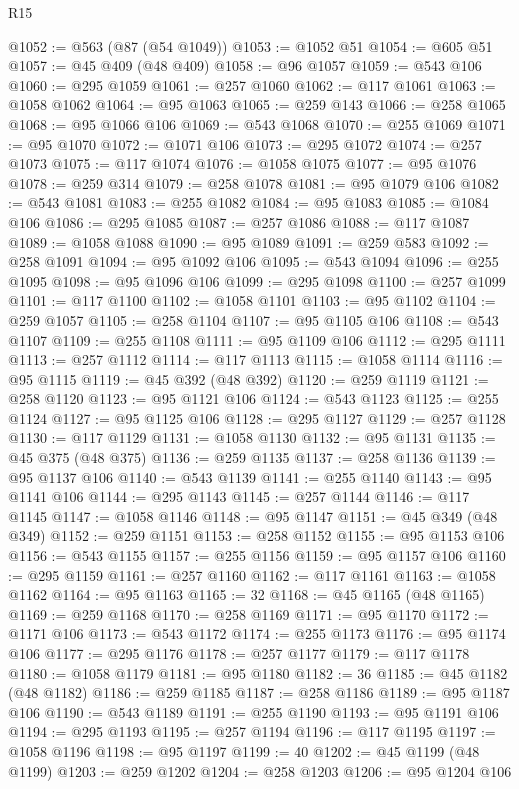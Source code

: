 \begin{lexlean}{R15}
\begin{coremodule}
@1052 := @563 (@87 (@54 @1049))
@1053 := @1052 @51
@1054 := @605 @51
@1057 := @45 @409 (@48 @409)
@1058 := @96 @1057
@1059 := @543 @106
@1060 := @295 @1059
@1061 := @257 @1060
@1062 := @117 @1061
@1063 := @1058 @1062
@1064 := @95 @1063
@1065 := @259 @143
@1066 := @258 @1065
@1068 := @95 @1066 @106
@1069 := @543 @1068
@1070 := @255 @1069
@1071 := @95 @1070
@1072 := @1071 @106
@1073 := @295 @1072
@1074 := @257 @1073
@1075 := @117 @1074
@1076 := @1058 @1075
@1077 := @95 @1076
@1078 := @259 @314
@1079 := @258 @1078
@1081 := @95 @1079 @106
@1082 := @543 @1081
@1083 := @255 @1082
@1084 := @95 @1083
@1085 := @1084 @106
@1086 := @295 @1085
@1087 := @257 @1086
@1088 := @117 @1087
@1089 := @1058 @1088
@1090 := @95 @1089
@1091 := @259 @583
@1092 := @258 @1091
@1094 := @95 @1092 @106
@1095 := @543 @1094
@1096 := @255 @1095
@1098 := @95 @1096 @106
@1099 := @295 @1098
@1100 := @257 @1099
@1101 := @117 @1100
@1102 := @1058 @1101
@1103 := @95 @1102
@1104 := @259 @1057
@1105 := @258 @1104
@1107 := @95 @1105 @106
@1108 := @543 @1107
@1109 := @255 @1108
@1111 := @95 @1109 @106
@1112 := @295 @1111
@1113 := @257 @1112
@1114 := @117 @1113
@1115 := @1058 @1114
@1116 := @95 @1115
@1119 := @45 @392 (@48 @392)
@1120 := @259 @1119
@1121 := @258 @1120
@1123 := @95 @1121 @106
@1124 := @543 @1123
@1125 := @255 @1124
@1127 := @95 @1125 @106
@1128 := @295 @1127
@1129 := @257 @1128
@1130 := @117 @1129
@1131 := @1058 @1130
@1132 := @95 @1131
@1135 := @45 @375 (@48 @375)
@1136 := @259 @1135
@1137 := @258 @1136
@1139 := @95 @1137 @106
@1140 := @543 @1139
@1141 := @255 @1140
@1143 := @95 @1141 @106
@1144 := @295 @1143
@1145 := @257 @1144
@1146 := @117 @1145
@1147 := @1058 @1146
@1148 := @95 @1147
@1151 := @45 @349 (@48 @349)
@1152 := @259 @1151
@1153 := @258 @1152
@1155 := @95 @1153 @106
@1156 := @543 @1155
@1157 := @255 @1156
@1159 := @95 @1157 @106
@1160 := @295 @1159
@1161 := @257 @1160
@1162 := @117 @1161
@1163 := @1058 @1162
@1164 := @95 @1163
@1165 := 32
@1168 := @45 @1165 (@48 @1165)
@1169 := @259 @1168
@1170 := @258 @1169
@1171 := @95 @1170
@1172 := @1171 @106
@1173 := @543 @1172
@1174 := @255 @1173
@1176 := @95 @1174 @106
@1177 := @295 @1176
@1178 := @257 @1177
@1179 := @117 @1178
@1180 := @1058 @1179
@1181 := @95 @1180
@1182 := 36
@1185 := @45 @1182 (@48 @1182)
@1186 := @259 @1185
@1187 := @258 @1186
@1189 := @95 @1187 @106
@1190 := @543 @1189
@1191 := @255 @1190
@1193 := @95 @1191 @106
@1194 := @295 @1193
@1195 := @257 @1194
@1196 := @117 @1195
@1197 := @1058 @1196
@1198 := @95 @1197
@1199 := 40
@1202 := @45 @1199 (@48 @1199)
@1203 := @259 @1202
@1204 := @258 @1203
@1206 := @95 @1204 @106

\end{coremodule}
\end{lexlean}
